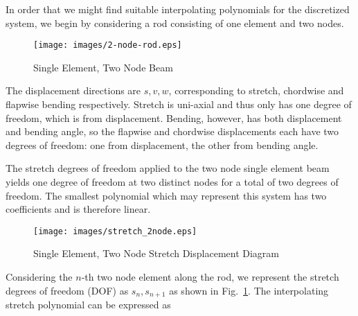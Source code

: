 
In order that we might find suitable interpolating polynomials for the discretized system, we begin by considering a rod consisting of one element and two nodes.

\begin{figure}[ht!]
\caption{Single Element, Two Node Beam}
\centering
\texttt{[image: images/2-node-rod.eps]}
\end{figure}

The displacement directions are $s,v,w$, corresponding to stretch, chordwise and flapwise bending respectively. Stretch is uni-axial and thus only has one degree of freedom, which is from displacement. Bending, however, has both displacement and bending angle, so the flapwise and chordwise displacements each have two degrees of freedom: one from displacement, the other from bending angle.

The stretch degrees of freedom applied to the two node single element beam yields one degree of freedom at two distinct nodes for a total of two degrees of freedom. The smallest polynomial which may represent this system has two coefficients and is therefore linear.

\begin{figure}[ht!]
\caption{Single Element, Two Node Stretch Displacement Diagram}
\centering
\texttt{[image: images/stretch\_2node.eps]}
\label{fig:2-node-stretch-dof}
\end{figure}

Considering the $n$-th two node element along the rod, we represent the stretch degrees of freedom (DOF) as $s_n,s_{n+1}$ as shown in Fig.~\ref{fig:2-node-stretch-dof}. The interpolating stretch polynomial can be expressed as 

